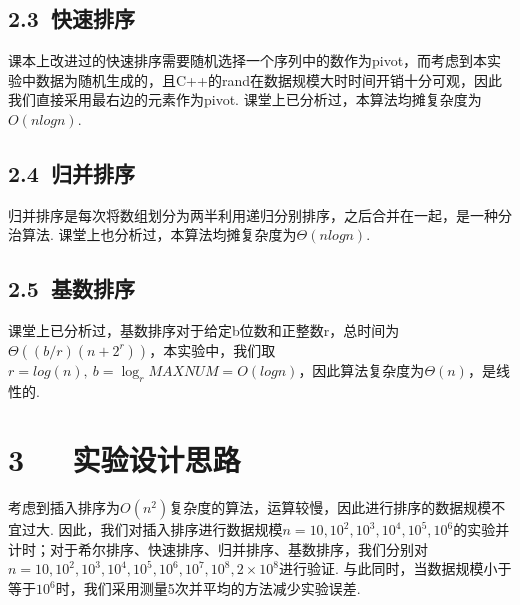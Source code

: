 \documentclass[UTF8]{ctexart}
\begin{document}
\subsection*{2.3\ 快速排序}
课本上改进过的快速排序需要随机选择一个序列中的数作为pivot，而考虑到本实验中数据为随机生成的，且C++的rand在数据规模大时时间开销十分可观，因此我们直接采用最右边的元素作为pivot. 课堂上已分析过，本算法均摊复杂度为$O(nlogn)$.
\subsection*{2.4\ 归并排序}
归并排序是每次将数组划分为两半利用递归分别排序，之后合并在一起，是一种分治算法. 课堂上也分析过，本算法均摊复杂度为$\Theta(nlogn)$.

\subsection*{2.5\ 基数排序}
课堂上已分析过，基数排序对于给定b位数和正整数r，总时间为$\Theta((b/r)(n+2^r))$，本实验中，我们取$r=log(n),\ b=\log_{r}{MAXNUM}=O(logn)$，因此算法复杂度为$\Theta(n)$，是线性的.


\section*{3\ \ \ 实验设计思路}
考虑到插入排序为$O(n^2)$复杂度的算法，运算较慢，因此进行排序的数据规模不宜过大. 因此，我们对插入排序进行数据规模$n=10, 10^2, 10^3, 10^4, 10^5, 10^6$的实验并计时；对于希尔排序、快速排序、归并排序、基数排序，我们分别对$n=10, 10^2, 10^3, 10^4, 10^5, 10^6, 10^7, 10^8, 2\times 10^8$进行验证. 与此同时，当数据规模小于等于$10^6$时，我们采用测量5次并平均的方法减少实验误差.
\end{document}
